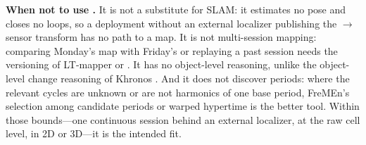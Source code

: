 \noindent\textbf{When not to use \sname.} It is not a substitute for SLAM: it estimates no pose and closes no loops, so a deployment without an external localizer publishing the $\to$sensor transform has no path to a map. It is not multi-session mapping: comparing Monday's map with Friday's or replaying a past session needs the versioning of LT-mapper or \citet{yang2025lifelong3d}. It has no object-level reasoning, unlike the object-level change reasoning of Khronos \citep{schmid2024khronos}. And it does not discover periods: where the relevant cycles are unknown or are not harmonics of one base period, FreMEn's selection among candidate periods \citep{krajnik2017fremen} or warped hypertime \citep{krajnik2019warped} is the better tool. Within those bounds---one continuous session behind an external localizer, at the raw cell level, in 2D or 3D---it is the intended fit.

